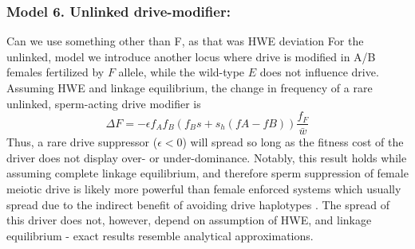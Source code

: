 \documentclass[12pt,letterpaper]{article}
\newcommand{\gc}[1]{{ \color{red} #1}}
\begin{document}
\subsubsection*{Model 6. Unlinked drive-modifier:}
\gc{Can we use something other than F, as that was HWE deviation}
For the unlinked, model we introduce another locus where drive is modified in A/B females fertilized by $F$ allele, 
	while the wild-type $E$ does not influence drive. 
Assuming HWE and linkage equilibrium, the change in frequency of a rare unlinked, sperm-acting drive modifier is 
\begin{equation} \Delta F =-\epsilon f_A f_B (f_B s + s_h (fA - fB) ) \frac{f_F}{\bar{w}}  \label{unlinked} \end{equation}
Thus, a rare drive suppressor ($\epsilon<0$) will spread so long as  the fitness cost of the driver does not display over- or under-dominance. 
Notably, this result holds while assuming complete linkage equilibrium, and therefore sperm suppression of female meiotic drive is likely more powerful than female enforced systems which usually spread due to the indirect benefit of avoiding drive haplotypes \citep[e.g. ][]{Brandvain2012}.  
The spread of this driver does not, however, depend on assumption of HWE, and linkage equilibrium - exact results resemble analytical approximations. 
\end{document}
